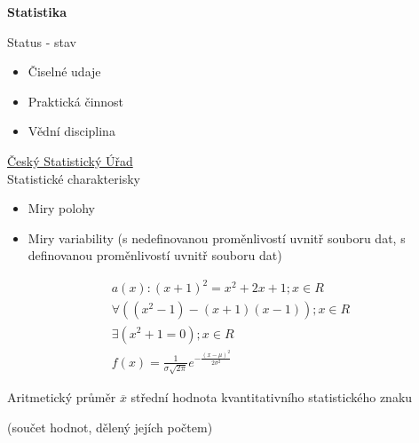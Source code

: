 \documentclass[a4paper,12pt]{article}
\begin{document}
\begin{table}[h]
	\centering
\end{table}

\textbf{Statistika}

Status - stav
\begin{itemize}
	\item Čiselné udaje
	\item Praktická činnost
	\item Vědní disciplina \\
\end{itemize}

\href{http://czso.cz}{Český Statistický Úřad} \\

Statistické charakterisky
\begin{itemize}
	\item Miry polohy
	\item Miry variability (s nedefinovanou proměnlivostí uvnitř souboru dat, s definovanou proměnlivostí uvnitř souboru dat) \\
\end{itemize}

\begin{align*}
a(x) : (x + 1)^2 = x^2 + 2x+1; x \in R \\
\forall	((x^2 - 1) - (x + 1)(x - 1)); x \in R \\
\exists	(x^2 + 1 = 0); x \in R \\
f(x) = \frac{1}{\sigma \sqrt{2\pi}} e^{-\frac{(x - \mu)^2}{2 \sigma^2}}
\end{align*}

\newpage
Aritmetický průměr $\overline{x}$ střední hodnota kvantitativního
statistického znaku 

(součet hodnot, dělený jejích počtem)
\end{document}
